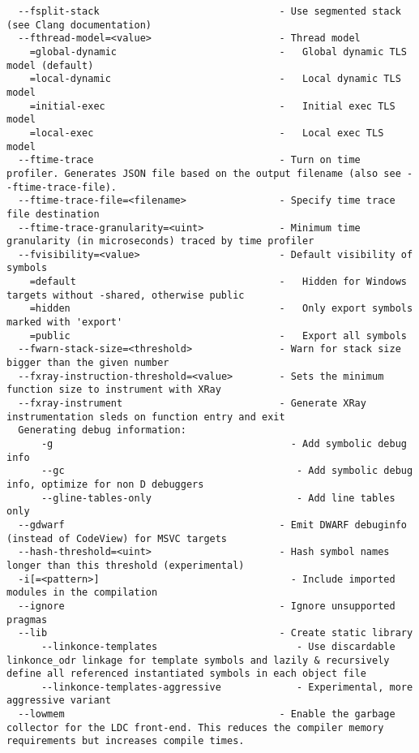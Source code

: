 \documentclass[732]{studrep}
\begin{document}
\begin{verbatim}
  --fsplit-stack                               - Use segmented stack (see Clang documentation)
  --fthread-model=<value>                      - Thread model
    =global-dynamic                            -   Global dynamic TLS model (default)
    =local-dynamic                             -   Local dynamic TLS model
    =initial-exec                              -   Initial exec TLS model
    =local-exec                                -   Local exec TLS model
  --ftime-trace                                - Turn on time profiler. Generates JSON file based on the output filename (also see --ftime-trace-file).
  --ftime-trace-file=<filename>                - Specify time trace file destination
  --ftime-trace-granularity=<uint>             - Minimum time granularity (in microseconds) traced by time profiler
  --fvisibility=<value>                        - Default visibility of symbols
    =default                                   -   Hidden for Windows targets without -shared, otherwise public
    =hidden                                    -   Only export symbols marked with 'export'
    =public                                    -   Export all symbols
  --fwarn-stack-size=<threshold>               - Warn for stack size bigger than the given number
  --fxray-instruction-threshold=<value>        - Sets the minimum function size to instrument with XRay
  --fxray-instrument                           - Generate XRay instrumentation sleds on function entry and exit
  Generating debug information:
      -g                                         - Add symbolic debug info
      --gc                                        - Add symbolic debug info, optimize for non D debuggers
      --gline-tables-only                         - Add line tables only
  --gdwarf                                     - Emit DWARF debuginfo (instead of CodeView) for MSVC targets
  --hash-threshold=<uint>                      - Hash symbol names longer than this threshold (experimental)
  -i[=<pattern>]                                 - Include imported modules in the compilation
  --ignore                                     - Ignore unsupported pragmas
  --lib                                        - Create static library
      --linkonce-templates                        - Use discardable linkonce_odr linkage for template symbols and lazily & recursively define all referenced instantiated symbols in each object file
      --linkonce-templates-aggressive             - Experimental, more aggressive variant
  --lowmem                                     - Enable the garbage collector for the LDC front-end. This reduces the compiler memory requirements but increases compile times.

\end{verbatim}
\end{document}
